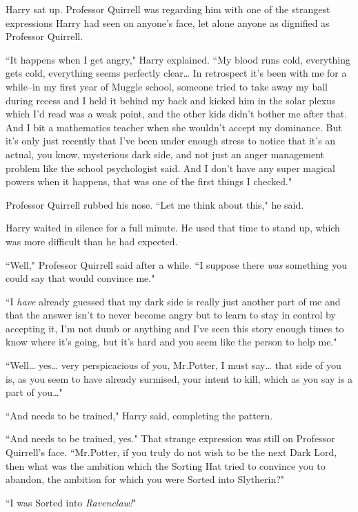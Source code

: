 Harry sat up. Professor Quirrell was regarding him with one of the strangest expressions Harry had seen on anyone's face, let alone anyone as dignified as Professor Quirrell.

``It happens when I get angry," Harry explained. ``My blood runs cold, everything gets cold, everything seems perfectly clear{\ldots} In retrospect it's been with me for a while\---in my first year of Muggle school, someone tried to take away my ball during recess and I held it behind my back and kicked him in the solar plexus which I'd read was a weak point, and the other kids didn't bother me after that. And I bit a mathematics teacher when she wouldn't accept my dominance. But it's only just recently that I've been under enough stress to notice that it's an actual, you know, mysterious dark side, and not just an anger management problem like the school psychologist said. And I don't have any super magical powers when it happens, that was one of the first things I checked."

Professor Quirrell rubbed his nose. ``Let me think about this," he said.

Harry waited in silence for a full minute. He used that time to stand up, which was more difficult than he had expected.

``Well," Professor Quirrell said after a while. ``I suppose there \emph{was} something you could say that would convince me."

``I \emph{have} already guessed that my dark side is really just another part of me and that the answer isn't to never become angry but to learn to stay in control by accepting it, I'm not dumb or anything and I've seen this story enough times to know where it's going, but it's hard and you seem like the person to help me."

``Well{\ldots} yes{\ldots} very perspicacious of you, Mr.\?Potter, I must say{\ldots} that side of you is, as you seem to have already surmised, your intent to kill, which as you say is a part of you{\ldots}"

``And needs to be trained," Harry said, completing the pattern.

``And needs to be trained, yes." That strange expression was still on Professor Quirrell's face. ``Mr.\?Potter, if you truly do not wish to be the next Dark Lord, then what was the ambition which the Sorting Hat tried to convince you to abandon, the ambition for which you were Sorted into Slytherin?"

``I was Sorted into \emph{Ravenclaw!}"


